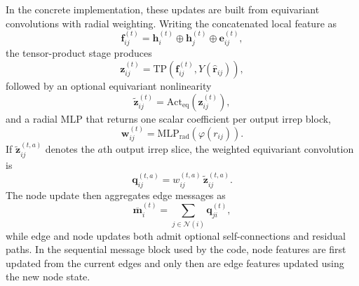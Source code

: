 \documentclass[preprint,12pt,compress,numafflabel]{elsarticle}
\begin{document}
In the concrete implementation, these updates are built from equivariant convolutions with radial weighting. Writing the concatenated local feature as
\begin{equation}
\bm{f}_{ij}^{(t)}
=
\bm{h}_i^{(t)} \oplus \bm{h}_j^{(t)} \oplus \bm{e}_{ij}^{(t)},
\end{equation}
the tensor-product stage produces
\begin{equation}
\bm{z}_{ij}^{(t)}
=
\mathrm{TP}\!\left(
\bm{f}_{ij}^{(t)},
Y(\hat{\bm{r}}_{ij})
\right),
\end{equation}
followed by an optional equivariant nonlinearity
\begin{equation}
\widetilde{\bm{z}}_{ij}^{(t)}
=
\mathrm{Act}_{\mathrm{eq}}\!\left(\bm{z}_{ij}^{(t)}\right),
\end{equation}
and a radial MLP that returns one scalar coefficient per output irrep block,
\begin{equation}
\bm{w}_{ij}^{(t)}
=
\mathrm{MLP}_{\mathrm{rad}}\!\left(\varphi(r_{ij})\right).
\end{equation}
If $\widetilde{\bm{z}}_{ij}^{(t,a)}$ denotes the $a$th output irrep slice, the weighted equivariant convolution is
\begin{equation}
\bm{q}_{ij}^{(t,a)}
=
w_{ij}^{(t,a)}\,\widetilde{\bm{z}}_{ij}^{(t,a)}.
\end{equation}
The node update then aggregates edge messages as
\begin{equation}
\overline{\bm{m}}_i^{(t)}
=
\sum_{j\in\mathcal{N}(i)}
\bm{q}_{ji}^{(t)},
\end{equation}
while edge and node updates both admit optional self-connections and residual paths.
In the sequential message block used by the code, node features are first updated from the current edges and only then are edge features updated using the new node state.
\end{document}
